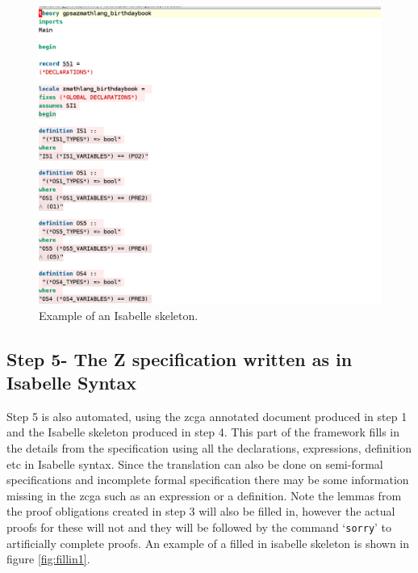 \begin{figure}[H]
 \begin{center}
 \includegraphics [scale=0.2]{Figures/Design/isaskeleton.png}
 \caption{Example of an Isabelle skeleton.}
 \label{fig:isaskelexample}
\end{center}
\end{figure} 

\subsection{Step 5- The Z specification written as in Isabelle Syntax}

Step 5 is also automated, using the \gls{zcga} annotated document produced in step 1 and the Isabelle skeleton produced in step 4. This part of the framework fills in the details from the specification using all the declarations, expressions, definition etc in Isabelle syntax. Since the translation can also be done on semi-formal specifications and incomplete formal specification there may be some information missing in the \gls{zcga} such as an expression or a definition. Note the lemmas from the proof obligations created in step 3 will also be filled in, however the actual proofs for these will not and they will be followed by the command `\texttt{sorry}' to artificially complete proofs. An example of a filled in isabelle skeleton is shown in figure \ref{fig:fillin1}.


